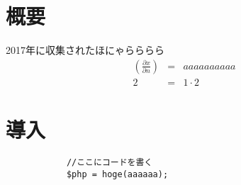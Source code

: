 \documentclass[../main]{subfiles}
\begin{document}
    \section*{概要}
        2017年に収集されたほにゃらららら\citep{nikkeidram4takai}\citep{akibagpu}
        \begin{eqnarray}
            \left( \frac{\partial x}{\partial n}\right) &=& aaaaaaaaaa\label{siki1}\\
            2 &=& 1 \cdot 2
        \end{eqnarray}
    \section{導入}
        \begin{lstlisting}
            //ここにコードを書く
            $php = hoge(aaaaaa);
        \end{lstlisting}
\end{document}
